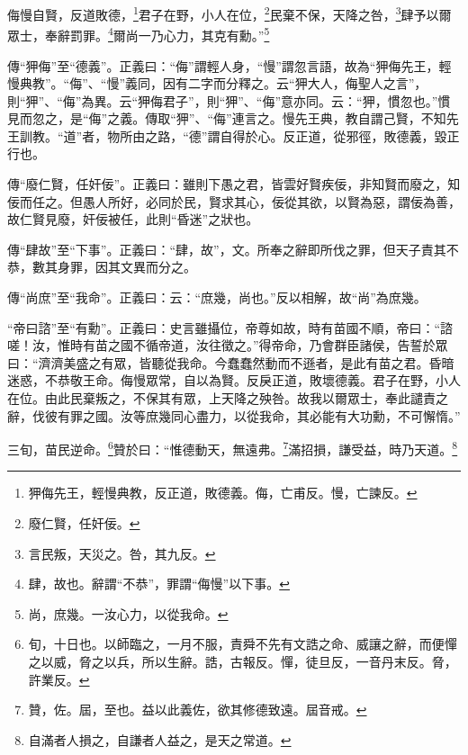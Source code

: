 侮慢自賢，反道敗德，\footnote{狎侮先王，輕慢典教，反正道，敗德義。侮，亡甫反。慢，亡諫反。}君子在野，小人在位，\footnote{廢仁賢，任奸佞。}民棄不保，天降之咎，\footnote{言民叛，天災之。咎，其九反。}肆予以爾眾士，奉辭罰罪。\footnote{肆，故也。辭謂“不恭”，罪謂“侮慢”以下事。}爾尚一乃心力，其克有勳。”\footnote{尚，庶幾。一汝心力，以從我命。}

{\noindent\zhuan{}\fzbyks 傳“狎侮”至“德義”。正義曰：“侮”謂輕人身，“慢”謂忽言語，故為“狎侮先王，輕慢典教”。“侮”、“慢”義同，因有二字而分釋之。云“狎大人，侮聖人之言”，則“狎”、“侮”為異。云“狎侮君子”，則“狎”、“侮”意亦同。云：“狎，慣忽也。”慣見而忽之，是“侮”之義。傳取“狎”、“侮”連言之。慢先王典，教自謂己賢，不知先王訓教。“道”者，物所由之路，“德”謂自得於心。反正道，從邪徑，敗德義，毀正行也。 \par}

{\noindent\zhuan{}\fzbyks 傳“廢仁賢，任奸佞”。正義曰：雖則下愚之君，皆雲好賢疾佞，非知賢而廢之，知佞而任之。但愚人所好，必同於民，賢求其心，佞從其欲，以賢為惡，謂佞為善，故仁賢見廢，奸佞被任，此則“昏迷”之狀也。 \par}

{\noindent\zhuan{}\fzbyks 傳“肆故”至“下事”。正義曰：“肆，故”，文。所奉之辭即所伐之罪，但天子責其不恭，數其身罪，因其文異而分之。 \par}

{\noindent\zhuan{}\fzbyks 傳“尚庶”至“我命”。正義曰：云：“庶幾，尚也。”反以相解，故“尚”為庶幾。 \par}

{\noindent\shu{}\fzkt “帝曰諮”至“有勳”。正義曰：史言雖攝位，帝尊如故，時有苗國不順，帝曰：“諮嗟！汝，惟時有苗之國不循帝道，汝往徵之。”得帝命，乃會群臣諸侯，告誓於眾曰：“濟濟美盛之有眾，皆聽從我命。今蠢蠢然動而不遜者，是此有苗之君。昏暗迷惑，不恭敬王命。侮慢眾常，自以為賢。反戾正道，敗壞德義。君子在野，小人在位。由此民棄叛之，不保其有眾，上天降之殃咎。故我以爾眾士，奉此譴責之辭，伐彼有罪之國。汝等庶幾同心盡力，以從我命，其必能有大功勳，不可懈惰。” \par}

三旬，苗民逆命。\footnote{旬，十日也。以師臨之，一月不服，責舜不先有文誥之命、威讓之辭，而便憚之以威，脅之以兵，所以生辭。誥，古報反。憚，徒旦反，一音丹末反。脅，許業反。}贊於曰：“惟德動天，無遠弗。\footnote{贊，佐。屆，至也。益以此義佐，欲其修德致遠。屆音戒。}滿招損，謙受益，時乃天道。\footnote{自滿者人損之，自謙者人益之，是天之常道。}


